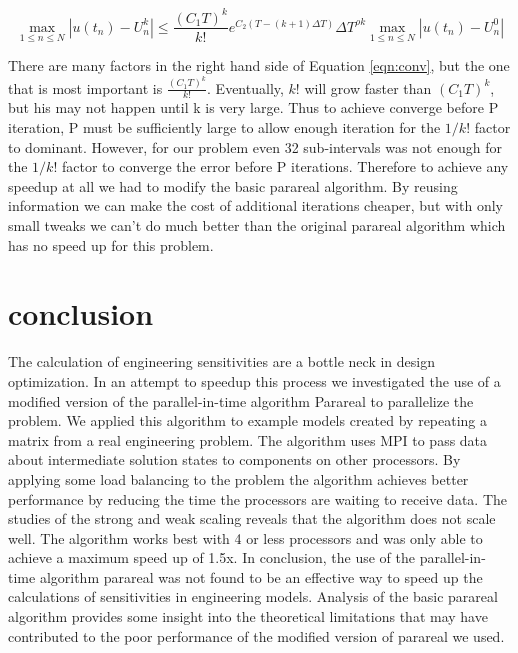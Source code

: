 \documentclass[conf]{new-aiaa}
\begin{document}
\begin{equation}
	\max _{1 \leq n \leq N}\left|u\left(t_{n}\right)-U_{n}^{k}\right| \leq \frac{\left(C_{1} T\right)^{k}}{k !} e^{C_{2}(T-(k+1) \Delta T)} \Delta T^{\rho k} \max _{1 \leq n \leq N}\left|u\left(t_{n}\right)-U_{n}^{0}\right|
	\label{eqn:conv}
\end{equation}

There are many factors in the right hand side of Equation \ref{eqn:conv}, but the one that is most important is $\frac{\left(C_{1} T\right)^{k}}{k !}$.
Eventually, $k!$ will grow faster than $\left(C_{1} T\right)^{k}$, but his may not happen until k is very large.
Thus to achieve converge before P iteration, P must be sufficiently large to allow enough iteration for the $1/k!$ factor to dominant.
However, for our problem even 32 sub-intervals was not enough for the $1/k!$ factor to converge the error before P iterations.
Therefore to achieve any speedup at all we had to modify the basic parareal algorithm.
By reusing information we can make the cost of additional iterations cheaper, but with only small tweaks we can't do much better than the original parareal algorithm which has no speed up for this problem.

\section{conclusion}


The calculation of engineering sensitivities are a bottle neck in design optimization.
In an attempt to speedup this process we investigated the use of a modified version of the parallel-in-time algorithm Parareal to parallelize the problem.
We applied this algorithm to example models created by repeating a matrix from a real engineering problem.
The algorithm uses MPI to pass data about intermediate solution states to components on other processors.
By applying some load balancing to the problem the algorithm achieves better performance by reducing the time the processors are waiting to receive data.
The studies of the strong and weak scaling reveals that the algorithm does not scale well.
The algorithm works best with 4 or less processors and was only able to achieve a maximum speed up of 1.5x.
In conclusion, the use of the parallel-in-time algorithm parareal was not found to be an effective way to speed up the calculations of sensitivities in engineering models.
Analysis of the basic parareal algorithm provides some insight into the theoretical limitations that may have contributed to the poor performance of the modified version of parareal we used.





\end{document}
